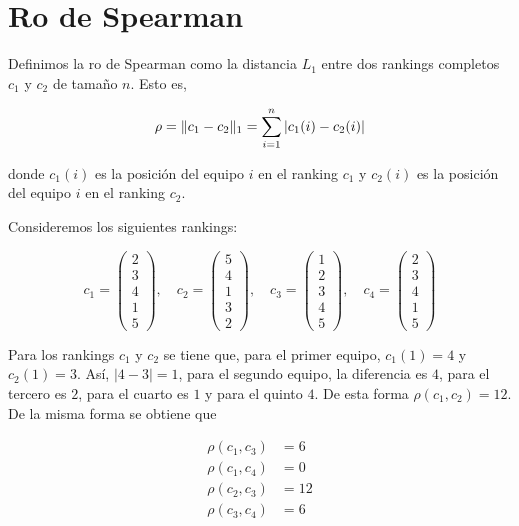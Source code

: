 \section{Ro de Spearman}

\begin{defi}[Ro de Spearman]
Definimos la ro de Spearman como la distancia $L_1$ entre dos rankings completos $c_1$ y $c_2$ de tamaño $n$. Esto es, 

\begin{equation}
\rho = \lVert c_1 - c_2 \rVert_1 = \sum\limits_{i=1}^{n} |c_1(i) - c_2(i)|
\end{equation}

donde $c_1(i)$ es la posición del equipo $i$ en el ranking $c_1$ y $c_2(i)$ es la posición del equipo $i$ en el ranking $c_2$.
\end{defi}

\begin{ejemplo}
Consideremos los siguientes rankings:

\begin{equation*}
c_1 = \left( \begin{array}{c}
2\\
3\\
4\\
1\\
5
\end{array} \right), \quad
c_2 = \left( \begin{array}{c}
5\\
4\\
1\\
3\\
2
\end{array} \right), \quad
c_3 = \left( \begin{array}{c}
1\\
2\\
3\\
4\\
5
\end{array} \right), \quad
c_4 = \left( \begin{array}{c}
2\\
3\\
4\\
1\\
5
\end{array} \right)
\end{equation*}

Para los rankings $c_1$ y $c_2$ se tiene que, para el primer equipo, $c_1(1) = 4$ y $c_2(1) = 3$. Así, $|4-3| = 1$, para el segundo equipo, la diferencia es $4$, para el tercero es $2$, para el cuarto es $1$ y para el quinto $4$. De esta forma $\rho(c_1, c_2) = 12$. De la misma forma se obtiene que 

\begin{align*}
\rho(c_1, c_3) & = 6\\
\rho(c_1, c_4) & = 0\\
\rho(c_2, c_3) & = 12\\
\rho(c_3, c_4) & = 6
\end{align*}  
\end{ejemplo}

